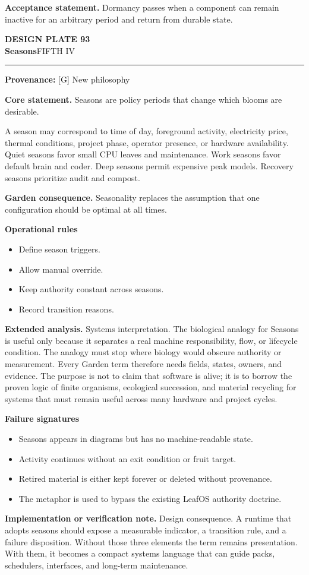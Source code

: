 \documentclass[10pt,letterpaper,oneside]{article}
\newcommand{\prov}[1]{\textcolor{gardenBlue}{\sffamily\footnotesize\textbf{Provenance:} #1}}
\newcommand{\platetitle}[3]{%
  \begin{minipage}[t][0.54in][t]{\textwidth}
  {\sffamily\bfseries\color{gardenDeep}\fontsize{9}{10}\selectfont DESIGN PLATE #1}\\[-1pt]
  {\sffamily\bfseries\color{gardenInk}\fontsize{16.5}{18}\selectfont #2}\hfill{\sffamily\color{gardenGreen}\large #3}
  \end{minipage}\vspace{-2pt}\hrule\vspace{5pt}}
\begin{document}
\begin{acceptbox}
\textbf{Acceptance statement.} Dormancy passes when a component can remain inactive for an arbitrary period and return from durable state.
\end{acceptbox}
\newpage
\platetitle{93}{Seasons}{FIFTH IV}
\prov{[G] New philosophy}
\fontsize{8.85}{10.45}\selectfont
\begin{corebox}
\textbf{Core statement.} Seasons are policy periods that change which blooms are desirable.
\end{corebox}
A season may correspond to time of day, foreground activity, electricity price, thermal conditions, project phase, operator presence, or hardware availability. Quiet seasons favor small CPU leaves and maintenance. Work seasons favor default brain and coder. Deep seasons permit expensive peak models. Recovery seasons prioritize audit and compost.

\textbf{Garden consequence.} Seasonality replaces the assumption that one configuration should be optimal at all times.

\textbf{Operational rules}
\begin{itemize}
\item Define season triggers.
\item Allow manual override.
\item Keep authority constant across seasons.
\item Record transition reasons.
\end{itemize}
\textbf{Extended analysis.} Systems interpretation. The biological analogy for Seasons is useful only because it separates a real machine responsibility, flow, or lifecycle condition. The analogy must stop where biology would obscure authority or measurement. Every Garden term therefore needs fields, states, owners, and evidence. The purpose is not to claim that software is alive; it is to borrow the proven logic of finite organisms, ecological succession, and material recycling for systems that must remain useful across many hardware and project cycles.

\textbf{Failure signatures}
\begin{itemize}
\item Seasons appears in diagrams but has no machine-readable state.
\item Activity continues without an exit condition or fruit target.
\item Retired material is either kept forever or deleted without provenance.
\item The metaphor is used to bypass the existing LeafOS authority doctrine.
\end{itemize}
\textbf{Implementation or verification note.} Design consequence. A runtime that adopts seasons should expose a measurable indicator, a transition rule, and a failure disposition. Without those three elements the term remains presentation. With them, it becomes a compact systems language that can guide packs, schedulers, interfaces, and long-term maintenance.
\end{document}
